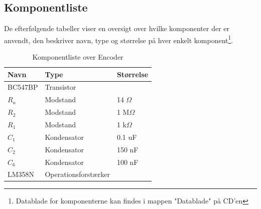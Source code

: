 \newpage
\subsection{Komponentliste}

De efterfølgende tabeller viser en oversigt over hvilke komponenter der er anvendt, den beskriver navn, type og størrelse på hver enkelt komponent\footnote{Datablade for komponenterne kan findes i mappen "Datablade" på CD'en}. 


\begin{table}[htbp] \centering
\caption{Komponentliste over Encoder}
\begin{small}
    \begin{tabular}{|p{2cm}|p{4cm}|p{2cm}|}
    \hline
    \textbf{Navn}    & \textbf{Type}                 & \textbf{Størrelse} \\ \hline
    BC547BP    & Transistor           & ~         \\ \hline
    $R_a$      & Modstand             & 14 $\Omega$    \\ \hline
    $R_2$      & Modstand             & 1 M$\Omega$    \\ \hline
    $R_1$      & Modstand             & 1 k$\Omega$    \\ \hline
    $C_1$      & Kondensator          & 0.1 uF    \\ \hline
    $C_2$      & Kondensator          & 150 nF    \\ \hline
    $C_6$      & Kondensator           & 100 nF    \\ \hline
    LM358N     & Operationsforstærker & ~         \\ \hline
    \end{tabular}
   \end{small}
\label{table:Komponentliste encoder}
\end{table}

